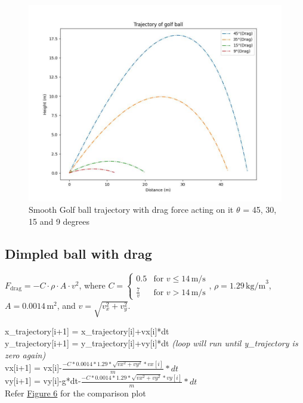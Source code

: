 \documentclass[11pt]{article}
\begin{document}
\begin{figure}[b]
    \centering
    \includegraphics[width=\textwidth, height=\textheight, keepaspectratio]{Golf_Trajectory_Smooth_Drag.jpeg}
    \caption{Smooth Golf ball trajectory with drag force acting on it $\theta$ = 45, 30, 15 and 9 degrees}
    \label{fig:Smooth_Fdrag_trajectory}
\end{figure}

\subsection{Dimpled ball with drag}

\( F_{\text{drag}} = -C \cdot \rho \cdot A \cdot v^2 \), where \( C = \begin{cases} 0.5 & \text{for } v \leq 14 \, \text{m/s} \\ \frac{7}{v} & \text{for } v > 14 \, \text{m/s} \end{cases} \), \( \rho = 1.29 \, \text{kg/m}^3 \), \( A = 0.0014 \, \text{m}^2 \), and \( v = \sqrt{v_x^2 + v_y^2} \).
\begin{raggedright}
\begin{justify}
x\_trajectory[i+1] = x\_trajectory[i]+vx[i]*dt\\
y\_trajectory[i+1] = y\_trajectory[i]+vy[i]*dt \textit{(loop will run until y\_trajectory is zero again)}\\
vx[i+1] = vx[i]-$\frac{-C*0.0014*1.29*\sqrt{vx^2+vy^2}*vx[i]}{m}*dt$\\
vy[i+1] = vy[i]-g*dt-$\frac{-C*0.0014*1.29*\sqrt{vx^2+vy^2}*vy[i]}{m}*dt$\\
Refer \hyperref[fig:Dimpled_Fdrag_trajectory]{Figure 6} for the comparison plot
\end{justify}
\end{raggedright}
\end{document}
